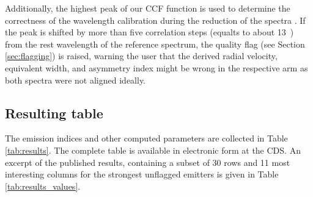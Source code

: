 Additionally, the highest peak of our CCF function is used to determine the correctness of the wavelength calibration during the reduction of the spectra \citep{2017MNRAS.464.1259K}. If the peak is shifted by more than five correlation steps (equalts to about 13~\kms) from the rest wavelength of the reference spectrum, the quality flag (see Section \ref{sec:flagging}) is raised, warning the user that the derived radial velocity, equivalent width, and asymmetry index might be wrong in the respective arm as both spectra were not aligned ideally.

\subsection{Resulting table}
\label{sec:results}
The emission indices and other computed parameters are collected in Table \ref{tab:results}. The complete table is available in electronic form at the CDS. An excerpt of the published results, containing a subset of 30 rows and 11 most interesting columns for the strongest unflagged emitters is given in Table \ref{tab:results_values}.


